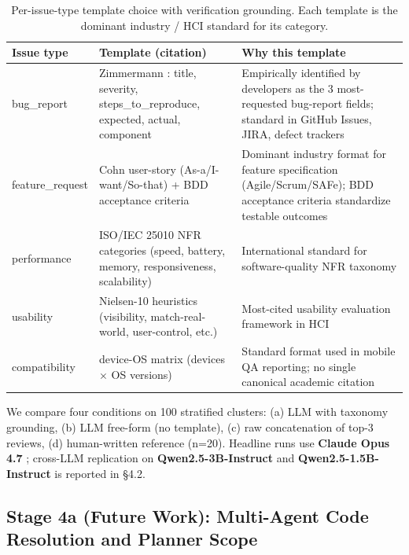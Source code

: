 \documentclass[sigconf, nonacm, anonymous, balance=false]{acmart}
\begin{document}
\begin{table}[t]\centering\footnotesize\setlength{\tabcolsep}{2pt}
\caption{Per-issue-type template choice with verification grounding. Each template is the dominant industry / HCI standard for its category.}\label{tab:templates}
\begin{tabular}{p{1.6cm}p{2.6cm}p{2.6cm}}\toprule
Issue type & Template (citation) & Why this template \\\midrule
bug\_report & Zimmermann \cite{zimmermann2010}: title, severity, steps\_to\_reproduce, expected, actual, component & Empirically identified by developers as the 3 most-requested bug-report fields; standard in GitHub Issues, JIRA, defect trackers \\
\addlinespace
feature\_request & Cohn user-story \cite{cohn2004user} (As-a/I-want/So-that) + BDD acceptance criteria \cite{wynne2017cucumber} & Dominant industry format for feature specification (Agile/Scrum/SAFe); BDD acceptance criteria standardize testable outcomes \\
\addlinespace
performance & ISO/IEC 25010 \cite{iso25010} NFR categories (speed, battery, memory, responsiveness, scalability) & International standard for software-quality NFR taxonomy \\
\addlinespace
usability & Nielsen-10 heuristics \cite{nielsen1994} (visibility, match-real-world, user-control, etc.) & Most-cited usability evaluation framework in HCI \cite{hartson2018ux, tullis2013measuring} \\
\addlinespace
compatibility & device-OS matrix (devices $\times$ OS versions) & Standard format used in mobile QA reporting; no single canonical academic citation \\\bottomrule
\end{tabular}\end{table}

We compare four conditions on 100 stratified clusters: (a) LLM with taxonomy grounding, (b) LLM free-form (no template), (c) raw concatenation of top-3 reviews, (d) human-written reference (n=20). Headline runs use \textbf{Claude Opus 4.7} \cite{anthropic2025claude}; cross-LLM replication on \textbf{Qwen2.5-3B-Instruct} \cite{yang2024qwen2_5} and \textbf{Qwen2.5-1.5B-Instruct} is reported in §4.2.

\subsection{Stage 4a (Future Work): Multi-Agent Code Resolution and Planner Scope}\label{stage-4a-future-work-multi-agent-code-resolution-and-planner-scope}
\end{document}
